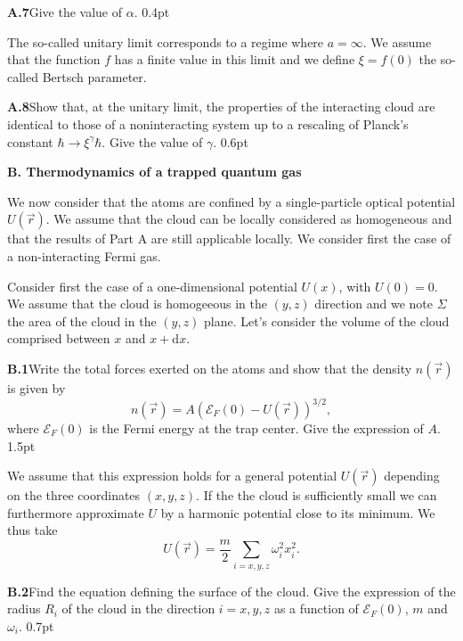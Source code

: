 \textbf{A.7}\quad Give the value of $\alpha$. \hfill 0.4pt

The so-called unitary limit corresponds to a regime where $a = \infty$. We
assume that the function $f$ has a finite value in this limit and we define
$\xi = f(0)$ the so-called Bertsch parameter.

\textbf{A.8}\quad Show that, at the unitary limit, the properties of the
interacting cloud are identical to those of a noninteracting system up to a
rescaling of Planck's constant $\hbar \to \xi^\gamma \hbar$. Give the value of
$\gamma$. \hfill 0.6pt

\textbf{B. Thermodynamics of a trapped quantum gas}

We now consider that the atoms are confined by a single-particle optical
potential $U(\overrightarrow{r})$. We assume that the cloud can be locally
considered as homogeneous and that the results of Part A are still applicable
locally. We consider first the case of a non-interacting Fermi gas.

Consider first the case of a one-dimensional potential $U(x)$, with
$U(0) = 0$. We assume that the cloud is homogeeous in the $(y, z)$ direction and
we note $\varSigma$ the area of the cloud in the $(y, z)$ plane. Let's consider
the volume of the cloud comprised between $x$ and $x + \mathrm{d}x$.

\textbf{B.1}\quad Write the total forces exerted on the atoms and show that the
density $n(\overrightarrow{r})$ is given by
\begin{equation}
n(\overrightarrow{r}) = A(\mathcal{E}_F(0) - U(\overrightarrow{r}))^{3/2}, \tag{5}
\end{equation}
where $\mathcal{E}_F(0)$ is the Fermi energy at the trap center. Give the
expression of $A$. \hfill 1.5pt

We assume that this expression holds for a general potential
$U(\overrightarrow{r})$ depending on the three coordinates $(x, y, z)$. If the
the cloud is sufficiently small we can furthermore approximate $U$ by a
harmonic potential close to its minimum. We thus take
\begin{equation}
U(\overrightarrow{r}) = \frac{m}{2} \sum_{i=x,y,z} \omega_i^2 x_i^2. \tag{6}
\end{equation}

\textbf{B.2}\quad Find the equation defining the surface of the cloud. Give the
expression of the radius $R_i$ of the cloud in the direction $i = x, y, z$ as a
function of $\mathcal{E}_F(0)$, $m$ and $\omega_i$. \hfill 0.7pt

